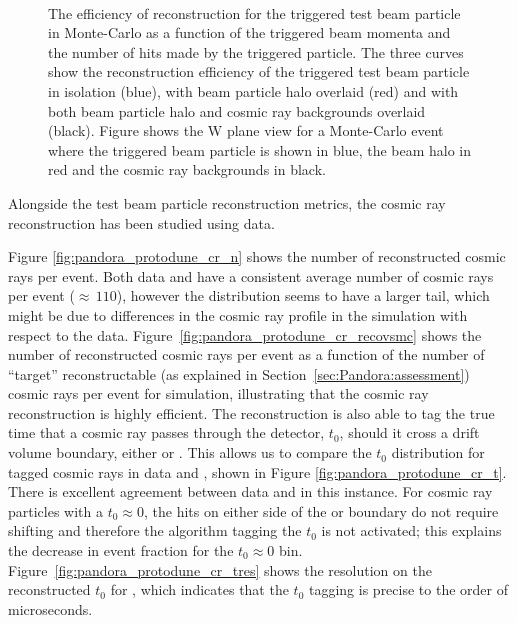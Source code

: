\begin{figure}[!ht]
\centering
{}
 \\
\caption[Reconstruction efficiency for test beam particle in  per momentum and hits]{The efficiency of reconstruction for the triggered test beam particle in Monte-Carlo as a function of \protect{} the triggered beam momenta and \protect{} the number of hits made by the triggered particle.  The three curves show the reconstruction efficiency of the triggered test beam particle in isolation (blue), with beam particle halo overlaid (red) and with both beam particle halo and cosmic ray backgrounds overlaid (black).  Figure \protect{} shows the W plane view for a Monte-Carlo event where the triggered beam particle is shown in blue, the beam halo in red and the cosmic ray backgrounds in black.}
\label{fig:pandora_protodune_tbrecoeffbrkdwn}
\end{figure}

Alongside the test beam particle reconstruction metrics, the  cosmic ray reconstruction has been studied using  data. 

Figure \ref{fig:pandora_protodune_cr_n} shows the number of reconstructed cosmic rays per event.  Both data and  have a consistent average number of cosmic rays per event ($\approx\,110$), however the  distribution seems to have a larger tail, which might be due to differences in the cosmic ray profile in the simulation with respect to the data. Figure~\ref{fig:pandora_protodune_cr_recovsmc} shows the number of reconstructed cosmic rays per event as a function of the number of ``target'' reconstructable (as explained in Section~\ref{sec:Pandora:assessment}) cosmic rays per event for  simulation, illustrating that the  cosmic ray reconstruction is highly efficient.  The  reconstruction is also able to tag the true time that a cosmic ray passes through the detector, $t_{0}$, should it cross a drift volume boundary, either  or .  This allows us to compare the $t_{0}$ distribution for tagged cosmic rays in data and , shown in Figure \ref{fig:pandora_protodune_cr_t}.  There is excellent agreement between data and  in this instance.  For cosmic ray particles with a $t_{0} \approx 0$, the hits on either side of the  or  boundary do not require shifting and therefore the algorithm tagging the $t_{0}$ is not activated; this explains the decrease in event fraction for the $t_{0} \approx 0$ bin.  Figure~\ref{fig:pandora_protodune_cr_tres} shows the resolution on the reconstructed $t_{0}$ for , which indicates that the  $t_{0}$ tagging is precise to the order of microseconds.  

